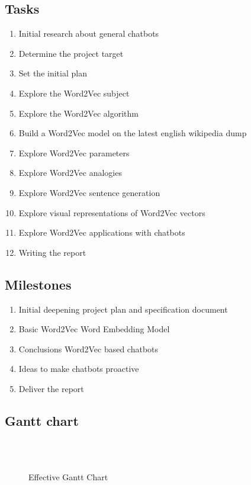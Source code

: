 \subsection{Tasks}
\begin{enumerate}
	\setlength\itemsep{0em}
	\item Initial research about general chatbots
	\item Determine the project target
	\item Set the initial plan
	\item Explore the Word2Vec subject
	\item Explore the Word2Vec algorithm
	\item Build a Word2Vec model on the latest english wikipedia dump
	\item Explore Word2Vec parameters
	\item Explore Word2Vec analogies
	\item Explore Word2Vec sentence generation
	\item Explore visual representations of Word2Vec vectors
	\item Explore Word2Vec applications with chatbots
	\item Writing the report
	
\end{enumerate}

\subsection{Milestones}
\begin{enumerate}
	\setlength\itemsep{0em}
	\item Initial deepening project plan and specification document
	\item Basic Word2Vec Word Embedding Model
	\item Conclusions Word2Vec based chatbots
	\item Ideas to make chatbots proactive
	\item Deliver the report
\end{enumerate}

\subsection{Gantt chart}
\begin{figure}[h]%
\centering
\begin{ganttchart}{1}{16}
\\
\\

\end{ganttchart}

\caption{Effective Gantt Chart}
\label{fig:gantt-effective}
\end{figure}
